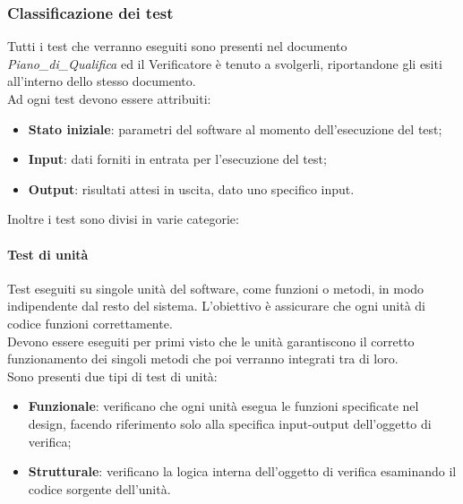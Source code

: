 \documentclass[10pt]{article}
\begin{document}
\begin{justify}
    \subsubsection{Classificazione dei test}
    Tutti i test che verranno eseguiti sono presenti nel documento \textit{Piano\_di\_Qualifica} ed il Verificatore è tenuto a svolgerli, riportandone gli esiti all'interno dello stesso documento.\\
    Ad ogni test devono essere attribuiti:
    \begin{itemize}
    \item \textbf{Stato iniziale}: parametri del software al momento dell'esecuzione del test;
    \item \textbf{Input}: dati forniti in entrata per l'esecuzione del test;
    \item \textbf{Output}: risultati attesi in uscita, dato uno specifico input.
    \end{itemize}
    Inoltre i test sono divisi in varie categorie:

    \paragraph{Test di unità}
    Test eseguiti su singole unità del software, come funzioni o metodi, in modo indipendente dal resto del sistema. L'obiettivo è assicurare che ogni unità di codice funzioni correttamente.\\
    Devono essere eseguiti per primi visto che le unità garantiscono il corretto funzionamento dei singoli metodi che poi verranno integrati tra di loro.\\
    Sono presenti due tipi di test di unità:
    \begin{itemize}
    \item \textbf{Funzionale}: verificano che ogni unità esegua le funzioni specificate nel design, facendo riferimento solo alla specifica input-output dell'oggetto di verifica;
    \item \textbf{Strutturale}: verificano la logica interna dell'oggetto di verifica esaminando il codice sorgente dell'unità.
    \end{itemize}


\end{justify}
\end{document}
